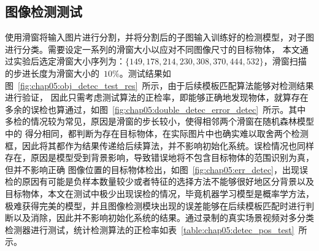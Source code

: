 \subsection{图像检测测试}
\label{sec:img_detect_test}
使用滑窗将输入图片进行分割，并将分割后的子图输入训练好的检测模型，对子图进行分类。需要设定一系列的滑窗大小以应对不同图像尺寸的目标物体，
本文通过实验后选定滑窗大小序列为：$\{149,178,214,230,308,370,444,532\}$，滑窗扫描的步进长度为滑窗大小的~$10\%$。测试结果如图~\ref{fig:chap05:obj_detec_test_res}~所示，由于后续模板匹配算法能够对检测结果进行验证，
因此只需考虑测试算法的正检率，即能够正确地发现物体，就算存在多余的误检也算通过，如图~\ref{fig:chap05:double_detec_error_detec}~所示。其中多检的情况较为常见，原因是滑窗的步长较小，使得相邻两个滑窗在随机森林模型中的
得分相同，都判断为存在目标物体，在实际图片中也确实难以取舍两个检测框，因此将其都作为结果传递给后续算法，并不影响初始化系统。误检情况也同样存在，原因是模型受到背景影响，导致错误地将不包含目标物体的范围识别为真，但并不影响正确
图像位置的目标物体检出，如图~\ref{fig:chap05:err_detec}，出现误检的原因有可能是负样本数量较少或者特征的选择方法不能够很好地区分背景以及目标物体，本文在测试中极少出现误检的情况，毕竟机器学习模型是概率学方法，
极难获得完美的模型，并且图像检测模块出现的误差能够在后续模板匹配时进行判断以及消除，因此并不影响初始化系统的结果。通过录制的真实场景视频对多分类检测器进行测试，统计检测算法的正检率如表~\ref{table:chap05:detec_pos_test}~所示。


